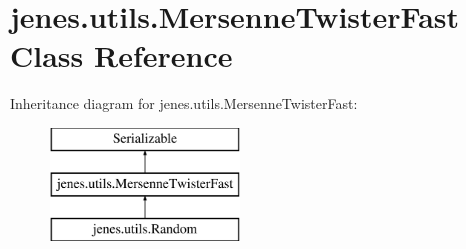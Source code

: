 \hypertarget{classjenes_1_1utils_1_1_mersenne_twister_fast}{\section{jenes.\-utils.\-Mersenne\-Twister\-Fast Class Reference}
\label{classjenes_1_1utils_1_1_mersenne_twister_fast}
}
Inheritance diagram for jenes.\-utils.\-Mersenne\-Twister\-Fast\-:\begin{figure}[H]
\begin{center}
\leavevmode
\includegraphics[height=3.000000cm]{classjenes_1_1utils_1_1_mersenne_twister_fast}
\end{center}
\end{figure}
